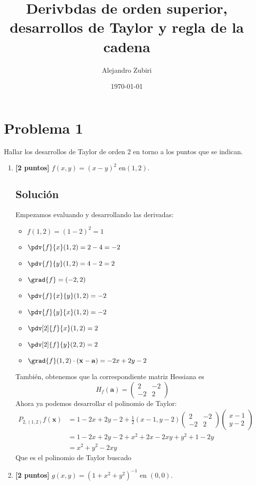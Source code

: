 \documentclass[12pt,a4paper,reqno]{article}
\title{Derivbdas de orden superior, desarrollos de Taylor y regla de la cadena}
\date{\today}
\author{Alejandro Zubiri}
\begin{document}
	\maketitle
	\section{Problema 1}
	Hallar los desarrollos de Taylor de orden 2 en torno a los puntos que se indican.
	\begin{enumerate}[label={(\alph*)}]
		\item \textbf{[2 puntos]} $f(x,y)=(x-y)^2$ en$(1,2)$.
		
		\subsection*{Solución}
		Empezamos evaluando y desarrollando las derivadas:
		\begin{itemize}
			\item $f(1,2)=(1-2) ^{2}=1$
			\item $\pdv{f}{x}(1,2)=2-4=-2$
			\item $\pdv{f}{y}(1,2)=4-2=2$
			\item $\grad{f}=(-2,2)$ 
			\item $\pdv{f}{x}{y}(1,2)=-2$ 
			\item $\pdv{f}{y}{x}(1,2)=-2$
			\item $\pdv[2]{f}{x}(1,2)=2$
			\item $\pdv[2]{f}{y}(2,2)=2$ 
			\item $\grad{f}(1,2)\cdot (\mathbf{x}-\mathbf{a})=-2x+2y-2$ 
		\end{itemize}
	También, obtenemos que la correspondiente matriz Hessiana es
	\[
	H_{f}(\mathbf{a})= \begin{pmatrix}
		2 & -2 \\ -2 & 2
	\end{pmatrix}
	\]
	Ahora ya podemos desarrollar el polinomio de Taylor:
	\begin{equation}
		\begin{split}
			P_{2,(1,2)}f(\mathbf{x})&=1-2x+2y-2+ \frac{1}{2}(x-1,y-2) \begin{pmatrix}
				2 & -2 \\ -2 & 2	
			\end{pmatrix} \begin{pmatrix}
				x-1 \\ y -2
			\end{pmatrix}\\
			&=1 -2x +2y -2 +x^{2}+2x-2xy+y^{2}+1-2y\\
			&=x ^{2}+y ^{2} -2xy
		\end{split}
	\end{equation}
	Que es el polinomio de Taylor buscado		
\item \textbf{[2 puntos]} $g(x,y)=(1+x^2+y^2)^{-1}$ en $(0,0)$.
		

\end{enumerate}
\end{document}
